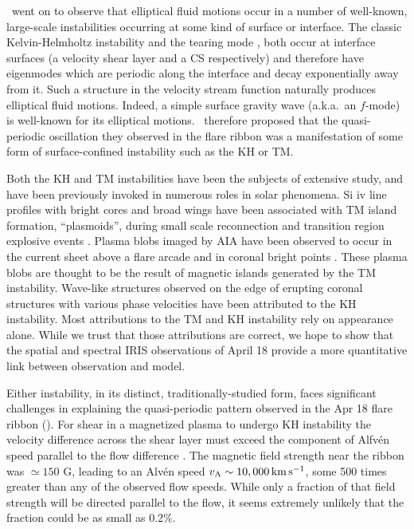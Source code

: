 \BLQ\ went on to observe that elliptical fluid motions occur in a number of well-known, large-scale instabilities occurring at some kind of surface or interface.  The classic Kelvin-Helmholtz instability \citep[KH,][]{Chandrasekhar1961} and the tearing mode \citep[{T}M,][]{Furth1963}, both occur at interface surfaces (a velocity shear layer and a CS respectively) and therefore have eigenmodes which are periodic along the interface and decay exponentially away from it.  Such a structure in the velocity stream function naturally produces elliptical fluid motions.  Indeed, a simple surface gravity wave (a.k.a.\ an $f$-mode) is well-known for its elliptical motions.  \BLQ\ therefore proposed that the quasi-periodic oscillation they observed in the flare ribbon was a manifestation of some form of surface-confined instability such as the KH or {T}M.

Both the KH and {T}M instabilities have been the subjects of extensive study, and have been previously invoked in numerous roles in solar phenomena. Si {\sc iv} line profiles with bright cores and broad wings have been associated with TM island formation, ``plasmoids'', during small scale reconnection and transition region explosive events \citep{Innes2015}.  Plasma blobs imaged by AIA \citep{Lemen2012} have been observed to occur in the current sheet above a flare arcade \citep{Takasao2012,Takasao2016} and in coronal bright points \citep{Zhang2016}.  These plasma blobs are thought to be the result of magnetic islands generated by the TM instability. Wave-like structures observed on the edge of erupting coronal structures \citep{Ofman2011,Foullon2011,Foullon2013} with various phase velocities have been attributed to the KH instability. Most attributions to the TM and KH instability rely on appearance alone.  While we trust that those attributions are correct, we hope to show that the spatial and spectral IRIS observations of April 18 provide a more quantitative link between observation and model.


 

Either instability, in its distinct, traditionally-studied form, faces significant challenges in explaining the quasi-periodic pattern observed in the Apr 18 flare ribbon (\BLQ).  For shear in a magnetized plasma to undergo KH instability the velocity difference across the shear layer must exceed the component of Alfv\'en speed parallel to the flow difference \citep{Chandrasekhar1961}.  The magnetic field strength near the ribbon was $\simeq 150$ G, leading to an Alv\'en speed $v_{\rm A}\sim 10,000\, {\rm km\, s^{-1}}$, some 500 times greater than any of the observed flow speeds.  While only a fraction of that field strength will be directed parallel to the flow, it seems extremely unlikely that the fraction could be as small as 0.2\%.  

